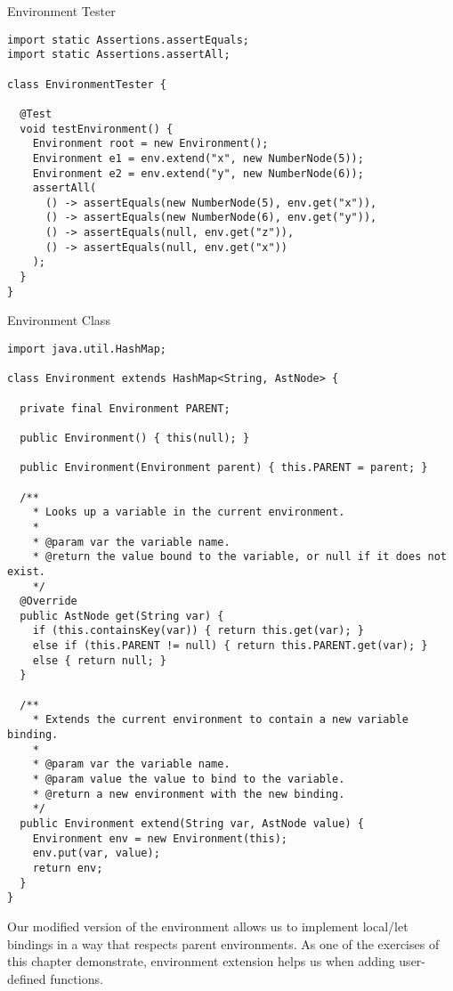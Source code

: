 \begin{cl}{Environment Tester}
\begin{lstlisting}[language=MyJava]
import static Assertions.assertEquals;
import static Assertions.assertAll;

class EnvironmentTester {
  
  @Test
  void testEnvironment() {
    Environment root = new Environment();
    Environment e1 = env.extend("x", new NumberNode(5));
    Environment e2 = env.extend("y", new NumberNode(6));
    assertAll(
      () -> assertEquals(new NumberNode(5), env.get("x")),
      () -> assertEquals(new NumberNode(6), env.get("y")),
      () -> assertEquals(null, env.get("z")),
      () -> assertEquals(null, env.get("x"))
    );
  }
}
\end{lstlisting}
\end{cl}
  
\begin{cl}{Environment Class}
\begin{lstlisting}[language=MyJava]
import java.util.HashMap;

class Environment extends HashMap<String, AstNode> {

  private final Environment PARENT;

  public Environment() { this(null); }

  public Environment(Environment parent) { this.PARENT = parent; }

  /**
    * Looks up a variable in the current environment.
    * 
    * @param var the variable name.
    * @return the value bound to the variable, or null if it does not exist.
    */
  @Override
  public AstNode get(String var) {
    if (this.containsKey(var)) { return this.get(var); }
    else if (this.PARENT != null) { return this.PARENT.get(var); }
    else { return null; }
  }

  /**
    * Extends the current environment to contain a new variable binding.
    * 
    * @param var the variable name.
    * @param value the value to bind to the variable.
    * @return a new environment with the new binding.
    */
  public Environment extend(String var, AstNode value) {
    Environment env = new Environment(this);
    env.put(var, value);
    return env;
  }
}
\end{lstlisting}
\end{cl} 

Our modified version of the environment allows us to implement local/let bindings in a way that respects parent environments. As one of the exercises of this chapter demonstrate, environment extension helps us when adding user-defined functions.

